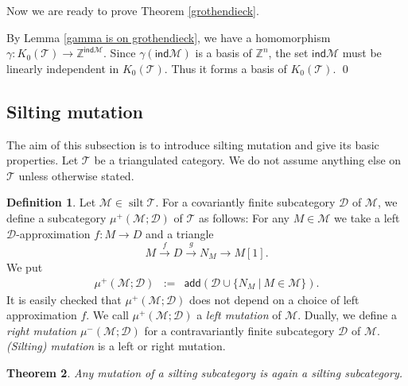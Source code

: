 \documentclass[a4paper,reqno]{amsart}
\newtheorem{theorem}{Theorem}[section]
\theoremstyle{definition}
\newtheorem{definition}[theorem]{Definition}
\newcommand{\DD}{{\mathcal D}}
\newcommand{\TT}{{\mathcal T}}
\newcommand{\MM}{{\mathcal M}}
\newcommand{\Z}{\mathbb{Z}}
\newcommand{\ind}{\mathsf{ind}}
\newcommand{\add}{\mathsf{add}}
\newcommand{\silt}{\operatorname{silt}\nolimits}
\begin{document}
Now we are ready to prove Theorem \ref{grothendieck}.

By Lemma \ref{gamma is on grothendieck}, we have a homomorphism $\gamma:K_0(\TT)\to\Z^{\ind\MM}$.
Since $\gamma(\ind\MM)$ is a basis of $\Z^n$,
the set $\ind\MM$ must be linearly independent in $K_0(\TT)$.
Thus it forms a basis of $K_0(\TT)$.
\qed



\subsection{Silting mutation}

The aim of this subsection is to introduce silting mutation and give its basic properties.
Let $\TT$ be a triangulated category. We do not assume anything else on $\TT$ unless otherwise stated.

\begin{definition}\label{mutation}
Let $\MM\in\silt\TT$. For a covariantly finite subcategory $\DD$ of $\MM$, we define a subcategory $\mu^+(\MM;\DD)$ of $\TT$ as follows:
For any $M\in\MM$ we take a left $\DD$-approximation $f:M\to D$ and a triangle
\begin{equation}\label{exchange}
M\xrightarrow{f}D\xrightarrow{g}N_M\to M[1].
\end{equation}
We put
\begin{eqnarray*}
\mu^+(\MM;\DD)&:=&\add(\DD\cup\{N_M\ |\ M\in\MM\}).
\end{eqnarray*}
It is easily checked that $\mu^+(\MM;\DD)$ does not depend on a choice of left approximation $f$.
We call $\mu^+(\MM;\DD)$ a \emph{left mutation} of $\MM$.
Dually, we define a \emph{right mutation} $\mu^-(\MM;\DD)$ for a contravariantly finite subcategory $\DD$ of $\MM$.
\emph{(Silting) mutation} is a left or right mutation.
\end{definition}

\begin{theorem}\label{thm:mutation is silting}
Any mutation of a silting subcategory is again a silting subcategory.
\end{theorem}
\end{document}
